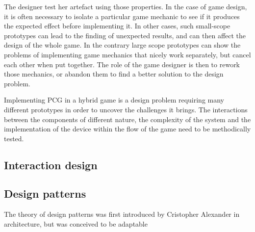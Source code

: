 The designer test her artefact using those properties. In the case of game design, it is often necessary to isolate a particular game mechanic to see if it produces the expected effect before implementing it. In other cases, such small-scope prototypes can lead to the finding of unexpected results, and can then affect the design of the whole game. In the contrary large scope prototypes can show the problems of implementing game mechanics that nicely work separately, but cancel each other when put together. The role of the game designer is then to rework those mechanics, or abandon them to find a better solution to the design problem. 

Implementing PCG in a hybrid game is a design problem requiring many different prototypes in order to uncover the challenges it brings. The interactions between the components of different nature, the complexity of the system and the implementation of the device within the flow of the game need to be methodically tested. 
\subsection{Interaction design}
\subsection{Design patterns}
The theory of design patterns was first introduced by Cristopher Alexander in architecture, but was conceived to be adaptable 

